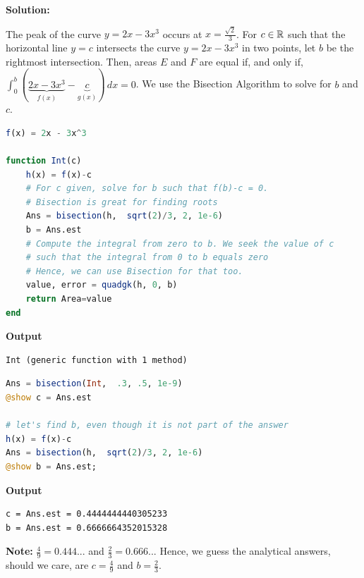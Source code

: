 \textbf{Solution:}

The peak of the curve $y=2x - 3 x^3$ occurs at $x = \frac{\sqrt{2}}{3}$. For $c \in \mathbb R$  such that the horizontal line $y=c$ intersects the curve $y=2x - 3 x^3$ in two points, let $b$ be the rightmost intersection. Then, areas $E$ and $F$ are equal if, and only if, $\int_0^b (\underbrace{2x - 3 x^3}_{f(x)} - \underbrace{c}_{g(x)})\, dx = 0$. We use the Bisection Algorithm to solve for $b$ and $c$.

\begin{lstlisting}[language=Julia,style=mystyle]
f(x) = 2x - 3x^3

function Int(c)
    h(x) = f(x)-c
    # For c given, solve for b such that f(b)-c = 0. 
    # Bisection is great for finding roots
    Ans = bisection(h,  sqrt(2)/3, 2, 1e-6)
    b = Ans.est
    # Compute the integral from zero to b. We seek the value of c
    # such that the integral from 0 to b equals zero
    # Hence, we can use Bisection for that too.
    value, error = quadgk(h, 0, b)
    return Area=value
end
\end{lstlisting}
\textbf{Output} 
\begin{verbatim}
Int (generic function with 1 method)
\end{verbatim}

\bigskip

\begin{lstlisting}[language=Julia,style=mystyle]
Ans = bisection(Int,  .3, .5, 1e-9)
@show c = Ans.est

# let's find b, even though it is not part of the answer
h(x) = f(x)-c
Ans = bisection(h,  sqrt(2)/3, 2, 1e-6)
@show b = Ans.est;
\end{lstlisting}
\textbf{Output} 
\begin{verbatim}
c = Ans.est = 0.4444444440305233
b = Ans.est = 0.6666664352015328
\end{verbatim}

\textbf{Note:} $\frac{4}{9}=0.444...$ and $\frac{2}{3}=0.666...$ Hence, we guess the analytical answers, should we care, are $c=\frac{4}{9}$ and $b=\frac{2}{3}$.

\Qed




